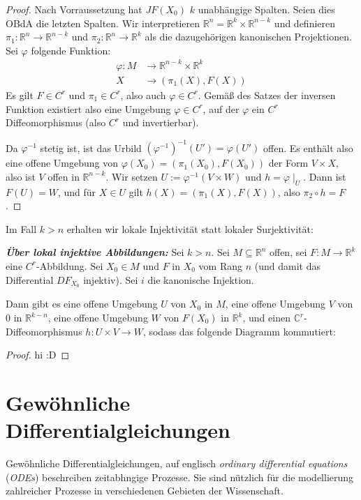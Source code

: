 \documentclass{report}
\newcommand*{\newpar}{\par\vspace{\baselineskip}\noindent}
\newcommand{\tbf}[1]{\textbf{#1}}
\newcommand{\bC}{\mathbb{C}}
\newcommand{\bR}{\mathbb{R}}
\begin{document}
\begin{proof}
Nach Vorraussetzung hat $JF(X_0)$ $k$ unabhängige Spalten. Seien dies OBdA die letzten Spalten. Wir interpretieren $\bR^n = \bR^k \times \bR^{n-k}$ und definieren $\pi_1 : \bR^n \to \bR^{n-k}$ und $\pi_2 : \bR^n \to \bR^k$ als die dazugehörigen kanonischen Projektionen. Sei $\varphi$ folgende Funktion:
\begin{align*}
 \varphi : M &\to \bR^{n-k} \times \bR^k\\
 X &\to (\pi_1(X), F(X))
\end{align*}
Es gilt $F \in C^r$ und $\pi_1 \in C^r$, also auch $\varphi \in C^r$. Gemäß des Satzes der inversen Funktion existiert also eine Umgebung $\varphi \in C^r$, auf der $\varphi$ ein $C^r$ Diffeomorphismus (also $C^r$ und invertierbar).
\newpar
Da $\varphi^{-1}$ stetig ist, ist das Urbild $(\varphi^{-1})^{-1}(U') = \varphi(U')$ offen. Es enthält also eine offene Umgebung von $\varphi(X_0) = (\pi_1(X_0), F(X_0))$ der Form $V \times X$, also ist $V$ offen in $\bR^{n-k}$. Wir setzen $U := \varphi^{-1}(V \times W)$ und $h = \varphi \mid_U$. Dann ist $F(U) = W$, und für $X \in U$ gilt $h(X) = (\pi_1(X), F(X))$, also $\pi_2 \circ h = F$.
\end{proof}
\noindent Im Fall $k > n$ erhalten wir lokale Injektivität statt lokaler Surjektivität:
\begin{theorem}
 \emph{\tbf{Über lokal injektive Abbildungen:}} Sei $k > n$. Sei $M \subseteq \bR^n$ offen, sei $F : M \to \bR^k$ eine $C^r$-Abbildung. Sei $X_0 \in M$ und $F$ in $X_0$ vom Rang $n$ (und damit das Differential $DF_{X_0}$ injektiv). Sei $i$ die kanonische Injektion.
 \newpar
 Dann gibt es eine offene Umgebung $U$ von $X_0$ in $M$, eine offene Umgebung $V$ von $0$ in $\bR^{k-n}$, eine offene Umgebung $W$ von $F(X_0)$ in $\bR^k$, und einen $\bC^r$-Diffeomorphismus $h : U \times V \to W$, sodass das folgende Diagramm kommutiert:
 \FloatBarrier
 \begin{figure}[h!]
 \centering
\end{figure}
\end{theorem}
\FloatBarrier
\begin{proof}
 hi :D
\end{proof}
\clearpage
[...]
\clearpage
%
%
%
%
%
%
%
%
%
%
\chapter{Gewöhnliche Differentialgleichungen}
Gewöhnliche Differentialgleichungen, auf englisch \textit{ordinary differential equations} (\textit{ODEs}) beschreiben zeitabhngige Prozesse. Sie sind nützlich für die modellierung zahlreicher Prozesse in verschiedenen Gebieten der Wissenschaft.
\end{document}
